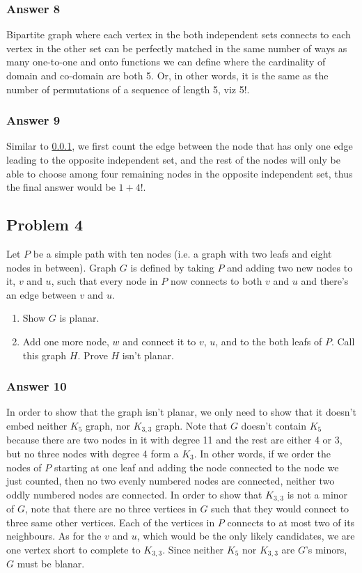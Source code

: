 \documentclass[11pt]{article}
\begin{document}
\subsubsection{Answer 8}
\label{sec:orgheadline10}
Bipartite graph where each vertex in the both independent sets connects to
each vertex in the other set can be perfectly matched in the same number of
ways as many one-to-one and onto functions we can define where the cardinality
of domain and co-domain are both 5.  Or, in other words, it is the same as
the number of permutations of a sequence of length 5, viz 5!.

\subsubsection{Answer 9}
\label{sec:orgheadline11}
Similar to \ref{sec:orgheadline10}, we first count the edge between the node that has only
one edge leading to the opposite independent set, and the rest of the nodes
will only be able to choose among four remaining nodes in the opposite
independent set, thus the final answer would be \(1 + 4!\).

\subsection{Problem 4}
\label{sec:orgheadline15}
Let \(P\) be a simple path with ten nodes (i.e. a graph with two leafs and
eight nodes in between).  Graph \(G\) is defined by taking \(P\) and adding two
new nodes to it, \(v\) and \(u\), such that every node in \(P\) now connects to
both \(v\) and \(u\) and there's an edge between \(v\) and \(u\).
\begin{enumerate}
\item Show \(G\) is planar.
\item Add one more node, \(w\) and connect it to \(v\), \(u\), and to the both leafs
of \(P\).  Call this graph \(H\). Prove \(H\) isn't planar.
\end{enumerate}

\subsubsection{Answer 10}
\label{sec:orgheadline13}
In order to show that the graph isn't planar, we only need to show that it
doesn't embed neither \(K_5\) graph, nor \(K_{3, 3}\) graph.  Note that \(G\)
doesn't contain \(K_5\) because there are two nodes in it with degree 11 and
the rest are either 4 or 3, but no three nodes with degree 4 form a \(K_3\).
In other words, if we order the nodes of \(P\) starting at one leaf and adding
the node connected to the node we just counted, then no two evenly numbered
nodes are connected, neither two oddly numbered nodes are connected.  In
order to show that \(K_{3,3}\) is not a minor of \(G\), note that there are no
three vertices in \(G\) such that they would connect to three same other
vertices.  Each of the vertices in \(P\) connects to at most two of its
neighbours. As for the \(v\) and \(u\), which would be the only likely
candidates, we are one vertex short to complete to \(K_{3, 3}\).
Since neither \(K_5\) nor \(K_{3, 3}\) are \(G\)'s minors, \(G\) must be blanar.
\end{document}
